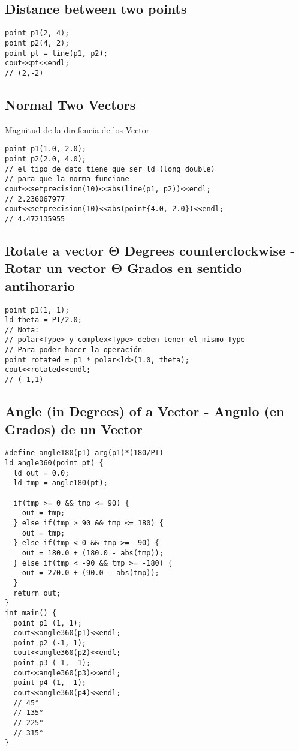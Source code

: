 \documentclass[10pt,letterpaper,twocolumn,twosided]{article}
\begin{document}
\subsection{Distance between two points}
\begin{lstlisting}
point p1(2, 4);
point p2(4, 2);
point pt = line(p1, p2);
cout<<pt<<endl;
// (2,-2)
\end{lstlisting}

\subsection{Normal Two Vectors}
Magnitud de la direfencia de los Vector
\begin{lstlisting}
point p1(1.0, 2.0);
point p2(2.0, 4.0);
// el tipo de dato tiene que ser ld (long double)
// para que la norma funcione
cout<<setprecision(10)<<abs(line(p1, p2))<<endl;
// 2.236067977
cout<<setprecision(10)<<abs(point{4.0, 2.0})<<endl;
// 4.472135955
\end{lstlisting}


\subsection{Rotate a vector Θ Degrees counterclockwise - Rotar un vector Θ Grados en sentido antihorario}
\begin{lstlisting}
point p1(1, 1);
ld theta = PI/2.0;
// Nota:
// polar<Type> y complex<Type> deben tener el mismo Type
// Para poder hacer la operación
point rotated = p1 * polar<ld>(1.0, theta);
cout<<rotated<<endl;
// (-1,1)
\end{lstlisting}

\subsection{Angle (in Degrees) of a Vector - Angulo (en Grados) de un Vector}
\begin{lstlisting}
#define angle180(p1) arg(p1)*(180/PI)
ld angle360(point pt) {
  ld out = 0.0;
  ld tmp = angle180(pt);

  if(tmp >= 0 && tmp <= 90) {
    out = tmp;
  } else if(tmp > 90 && tmp <= 180) {
    out = tmp;
  } else if(tmp < 0 && tmp >= -90) {
    out = 180.0 + (180.0 - abs(tmp));
  } else if(tmp < -90 && tmp >= -180) {
    out = 270.0 + (90.0 - abs(tmp));
  }
  return out;
}
int main() {
  point p1 (1, 1);
  cout<<angle360(p1)<<endl;
  point p2 (-1, 1);
  cout<<angle360(p2)<<endl;
  point p3 (-1, -1);
  cout<<angle360(p3)<<endl;
  point p4 (1, -1);
  cout<<angle360(p4)<<endl;
  // 45°
  // 135°
  // 225°
  // 315°
}
\end{lstlisting}
\end{document}
